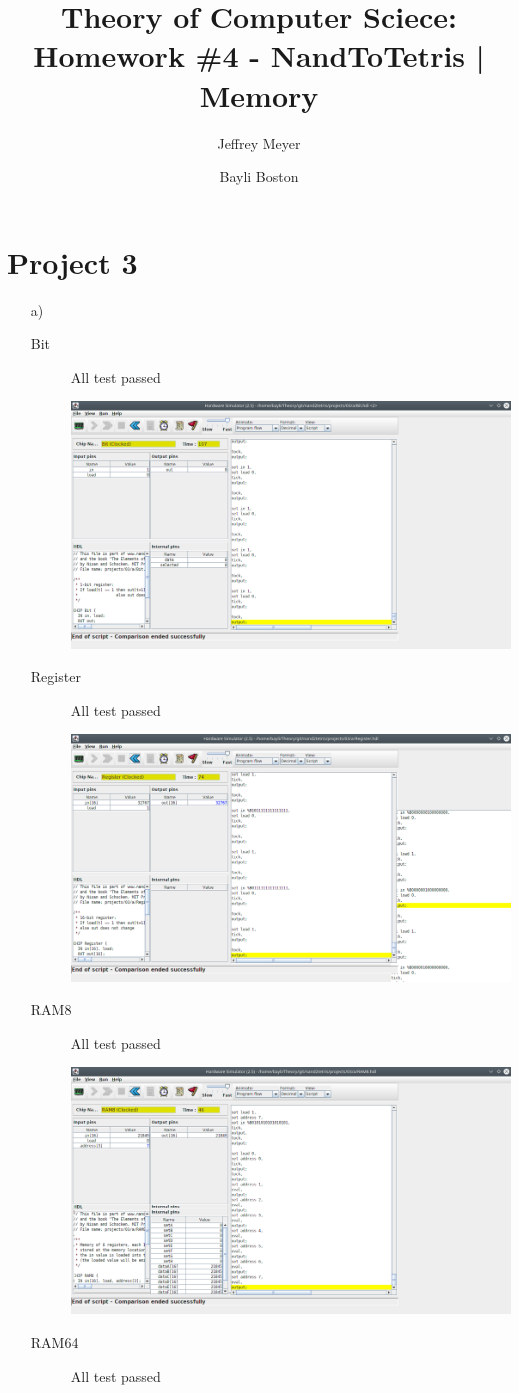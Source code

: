 \documentclass[titlepage]{article}
\author{Jeffrey Meyer \and Bayli Boston}
\title{Theory of Computer Sciece: Homework \#4 - NandToTetris | Memory}
\begin{document}
\maketitle

\newpage

\section{Project 3}

\begin{enumerate}
  \item[a)]{
    \begin{description}
      \item[Bit]{
        All test passed

        \includegraphics[width=.9\textwidth]{a/Bit.png}
      }
      \item[Register]{
        All test passed

        \includegraphics[width=.9\textwidth]{a/Register.png}
      }
      \item[RAM8]{
        All test passed

        \includegraphics[width=.9\textwidth]{a/RAM8.png}
      }
      \item[RAM64]{
        All test passed

}
\end{description}}
\end{enumerate}
\end{document}
